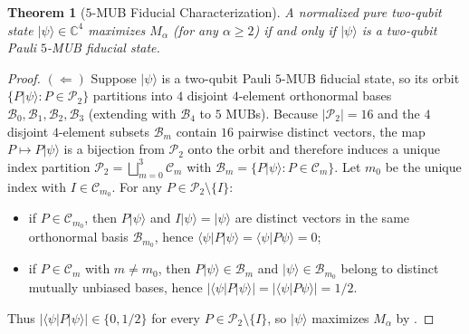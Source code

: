 \documentclass[11pt,a4paper]{article}
\theoremstyle{plain}
\newtheorem{theorem}{Theorem}[section]
\theoremstyle{definition}
\theoremstyle{remark}
\newcommand{\C}{\mathbb{C}}
\newcommand{\ket}[1]{\lvert #1 \rangle}
\newcommand{\braket}[2]{\langle #1 \vert #2 \rangle}
\newcommand{\expval}[2]{\langle #1 \vert #2 \vert #1 \rangle}
\newcommand{\Pauli}{\mathcal{P}}
\begin{document}
\begin{theorem}[$5$-MUB Fiducial Characterization]
\label{thm:mub-equiv}
A normalized pure two-qubit state $\ket{\psi} \in \C^4$ maximizes $M_\alpha$ (for any $\alpha \ge 2$) if and only if $\ket{\psi}$ is a two-qubit Pauli $5$-MUB fiducial state.
\end{theorem}

\begin{proof}
$(\Leftarrow)$ Suppose $\ket{\psi}$ is a two-qubit Pauli $5$-MUB fiducial state, so its orbit $\{P\ket{\psi} : P \in \Pauli_2\}$ partitions into $4$ disjoint $4$-element orthonormal bases $\mathcal{B}_0, \mathcal{B}_1, \mathcal{B}_2, \mathcal{B}_3$ (extending with $\mathcal{B}_4$ to $5$ MUBs). Because $\lvert\Pauli_2\rvert = 16$ and the $4$ disjoint $4$-element subsets $\mathcal{B}_m$ contain $16$ pairwise distinct vectors, the map $P \mapsto P\ket{\psi}$ is a bijection from $\Pauli_2$ onto the orbit and therefore induces a unique index partition $\Pauli_2 = \bigsqcup_{m=0}^3 \mathcal{C}_m$ with $\mathcal{B}_m = \{P\ket{\psi} : P \in \mathcal{C}_m\}$. Let $m_0$ be the unique index with $I \in \mathcal{C}_{m_0}$. For any $P \in \Pauli_2 \setminus \{I\}$:
\begin{itemize}[leftmargin=1.8em, itemsep=2pt]
  \item if $P \in \mathcal{C}_{m_0}$, then $P\ket{\psi}$ and $I\ket{\psi} = \ket{\psi}$ are distinct vectors in the same orthonormal basis $\mathcal{B}_{m_0}$, hence $\expval{\psi}{P} = \braket{\psi}{P\psi} = 0$;
  \item if $P \in \mathcal{C}_m$ with $m \neq m_0$, then $P\ket{\psi} \in \mathcal{B}_m$ and $\ket{\psi} \in \mathcal{B}_{m_0}$ belong to distinct mutually unbiased bases, hence $\lvert\expval{\psi}{P}\rvert = \lvert\braket{\psi}{P\psi}\rvert = 1/2$.
\end{itemize}
Thus $\lvert\expval{\psi}{P}\rvert \in \{0, 1/2\}$ for every $P \in \Pauli_2 \setminus \{I\}$, so $\ket{\psi}$ maximizes $M_\alpha$ by .


\end{proof}
\end{document}
